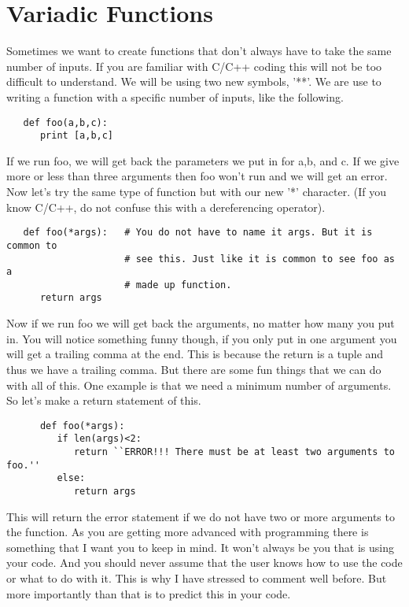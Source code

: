 \documentclass[11pt]{article}   %
\begin{document}
\section*{Variadic Functions}
Sometimes we want to create functions that don't always have to take the same number of inputs.  If you are familiar with C/C++ coding this will not be too difficult to understand.  We will be using two new symbols, '**'.
We are use to writing a function with a specific number of inputs, like the following.
\begin{tcolorbox}
   \begin{lstlisting}
   def foo(a,b,c):
      print [a,b,c]
   \end{lstlisting}
\end{tcolorbox}
If we run foo, we will get back the parameters we put in for a,b, and c.  If we give more or less than three arguments then foo won't run and we will get an error. Now let's try the same type of function but with our new '*' character.
(If you know C/C++, do not confuse this with a dereferencing operator).  
\begin{tcolorbox}
   \begin{lstlisting}
   def foo(*args):   # You do not have to name it args. But it is common to 
                     # see this. Just like it is common to see foo as a 
                     # made up function.
      return args
   \end{lstlisting}
\end{tcolorbox}
Now if we run foo we will get back the arguments, no matter how many you put in.  You will notice something funny though, if you only put in one argument you will get a trailing comma at the end. This is because the return is a 
tuple and thus we have a trailing comma.  But there are some fun things that we can do with all of this.  One example is that we need a minimum number of arguments.  So let's make a return statement of this.
\begin{tcolorbox}
   \begin{lstlisting}
      def foo(*args):
         if len(args)<2:
            return ``ERROR!!! There must be at least two arguments to foo.''
         else:
            return args
   \end{lstlisting}
\end{tcolorbox}
This will return the error statement if we do not have two or more arguments to the function.  As you are getting more advanced with programming there is something that I want you to keep in mind.  It won't always be you that is 
using your code.  And you should never assume that the user knows how to use the code or what to do with it.  This is why I have stressed to comment well before.  But more importantly than that is to predict this in your code.
\end{document}
